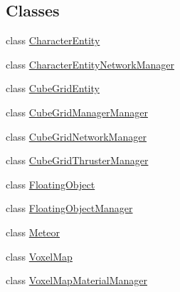 \subsection*{Classes}
\begin{DoxyCompactItemize}
\item 
class \hyperlink{class_s_e_mod_a_p_i_internal_1_1_a_p_i_1_1_entity_1_1_sector_1_1_sector_object_1_1_character_entity}{Character\+Entity}
\item 
class \hyperlink{class_s_e_mod_a_p_i_internal_1_1_a_p_i_1_1_entity_1_1_sector_1_1_sector_object_1_1_character_entity_network_manager}{Character\+Entity\+Network\+Manager}
\item 
class \hyperlink{class_s_e_mod_a_p_i_internal_1_1_a_p_i_1_1_entity_1_1_sector_1_1_sector_object_1_1_cube_grid_entity}{Cube\+Grid\+Entity}
\item 
class \hyperlink{class_s_e_mod_a_p_i_internal_1_1_a_p_i_1_1_entity_1_1_sector_1_1_sector_object_1_1_cube_grid_manager_manager}{Cube\+Grid\+Manager\+Manager}
\item 
class \hyperlink{class_s_e_mod_a_p_i_internal_1_1_a_p_i_1_1_entity_1_1_sector_1_1_sector_object_1_1_cube_grid_network_manager}{Cube\+Grid\+Network\+Manager}
\item 
class \hyperlink{class_s_e_mod_a_p_i_internal_1_1_a_p_i_1_1_entity_1_1_sector_1_1_sector_object_1_1_cube_grid_thruster_manager}{Cube\+Grid\+Thruster\+Manager}
\item 
class \hyperlink{class_s_e_mod_a_p_i_internal_1_1_a_p_i_1_1_entity_1_1_sector_1_1_sector_object_1_1_floating_object}{Floating\+Object}
\item 
class \hyperlink{class_s_e_mod_a_p_i_internal_1_1_a_p_i_1_1_entity_1_1_sector_1_1_sector_object_1_1_floating_object_manager}{Floating\+Object\+Manager}
\item 
class \hyperlink{class_s_e_mod_a_p_i_internal_1_1_a_p_i_1_1_entity_1_1_sector_1_1_sector_object_1_1_meteor}{Meteor}
\item 
class \hyperlink{class_s_e_mod_a_p_i_internal_1_1_a_p_i_1_1_entity_1_1_sector_1_1_sector_object_1_1_voxel_map}{Voxel\+Map}
\item 
class \hyperlink{class_s_e_mod_a_p_i_internal_1_1_a_p_i_1_1_entity_1_1_sector_1_1_sector_object_1_1_voxel_map_material_manager}{Voxel\+Map\+Material\+Manager}
\end{DoxyCompactItemize}
